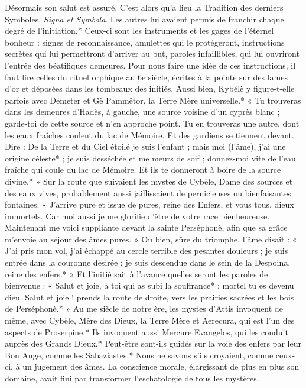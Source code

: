 \documentclass[a4paper, 11pt, oneside, polutonikogreek, french]{article}
\begin{document}
Désormais son salut est assuré. C'est alors qu'a lieu la Tradition des derniers Symboles, \emph{Signa et Symbola}. Les autres lui avaient permis de franchir chaque degré de l'initiation.* Ceux-ci sont les instruments et les gages de l'éternel bonheur : signes de reconnaissance, amulettes qui le protégeront, instructions secrètes qui lui permettront d'arriver au but, paroles infaillibles, qui lui ouvriront l'entrée des béatifiques demeures. Pour nous faire une idée de ces instructions, il faut lire celles du rituel orphique au 6e siècle, écrites à la pointe sur des lames d'or et déposées dans les tombeaux des initiés. Aussi bien, Kybélè y figure-t-elle parfois avec Démeter et Gê Pammêtor, la Terre Mère universelle.* « Tu trouveras dans les demeures d'Hadès, à gauche, une source voisine d'un cyprès blanc ; garde-toi de cette source et n'en approche point. Tu en trouveras une autre, dont les eaux fraîches coulent du lac de Mémoire. Et des gardiens se tiennent devant. Dire : De la Terre et du Ciel étoilé je suis l'enfant ; mais moi (l'âme), j'ai une origine céleste* ; je suis desséchée et me meurs de soif ; donnez-moi vite de l'eau fraîche qui coule du lac de Mémoire. Et ils te donneront à boire de la source divine.* » Sur la route que suivaient les mystes de Cybèle, Dame des sources et des eaux vives, probablement aussi jaillissaient de pernicieuses ou bienfaisantes fontaines. « J'arrive pure et issue de pures, reine des Enfers, et vous tous, dieux immortels. Car moi aussi je me glorifie d'être de votre race bienheureuse. Maintenant me voici suppliante devant la sainte Perséphonè, afin que sa grâce m'envoie au séjour des âmes pures. » Ou bien, sûre du triomphe, l'âme disait : « J'ai pris mon vol, j'ai échappé au cercle terrible des pesantes douleurs ; je suis entrée dans la couronne désirée ; je suis descendue dans le sein de la Despoina, reine des enfers.* » Et l'initié sait à l'avance quelles seront les paroles de bienvenue : « Salut et joie, à toi qui as subi la souffrance* ; mortel tu es devenu dieu. Salut et joie ! prends la route de droite, vers les prairies sacrées et les bois de Perséphonè.* » Au me siècle de notre ère, les mystes d'Attis invoquent de même, avec Cybèle, Mère des Dieux, la Terre Mère et Aerecura, qui est l'un des aspects de Proserpine.* Ils invoquent aussi Mercure Evangelos, qui les conduit auprès des Grands Dieux.* Peut-être sont-ils guidés sur la voie des enfers par leur Bon Ange, comme les Sabaziastes.* Nous ne savons s'ils croyaient, comme ceux-ci, à un jugement des âmes. La conscience morale, élargissant de plus en plus son domaine, avait fini par transformer l'eschatologie de tous les mystères.
\end{document}
